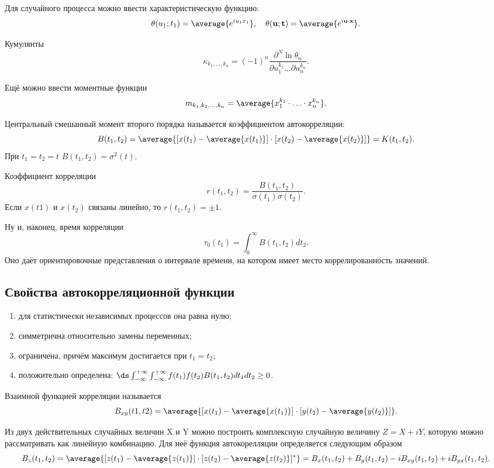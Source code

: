 Для случайного процесса можно ввести характеристическую функцию:
\[
    \theta(u_1;t_1) = \average{e^{iu_1x_1}},\quad
    \theta(\mathbf{u};\mathbf{t}) = \average{e^{i\mathbf{u}\cdot\mathbf{x}}}.
\]

Кумулянты
\[
    \kappa_{k_1,\ldots,k_n} = (-1)^n\frac{\partial^N\ln\theta_n}
    {\partial u_1^{k_1} \ldots \partial u_n^{k_n}}.
\]

Ещё можно ввести моментные функции
\[
    m_{k_1,k_2,\ldots,k_n} = \average{x_1^{k_1}\cdot\ldots\cdot x_n^{k_n}}.
\]

Центральный смешанный момент второго порядка называется коэффициентом
автокорреляции:
\[
    B(t_1, t_2) = \average{[x(t_1) - \average{x(t_1)}]\cdot
    [x(t_2) - \average{x(t_2)}]} = K(t_1,t_2).
\]
При \( t_1 = t_2 = t \) \( B(t_1, t_2) = \sigma^2(t) \).

Коэффициент корреляции
\[
    r(t_1, t_2) = \frac{B(t_1,t_2)}{\sigma(t_1)\sigma(t_2)}.
\]
Если \( x(t1) \) и \( x(t_2) \) связаны линейно, то \( r(t_1, t_2) = \pm 1 \).

Ну и, наконец, время корреляции
\[
    \tau_0(t_1) = \int_0^\infty B(t_1,t_2) dt_2.
\]
Оно даёт ориентировочные представления о интервале времени, на котором имеет
место коррелированность значений.

\subsection{Свойства автокорреляционной функции}
\begin{enumerate}
    \item для статистически независимых процессов она равна нулю;
    \item симметрична относительно замены переменных;
    \item ограничена, причём максимум достигается при \( t_1 = t_2 \);
    \item положительно определена:
        \( \ds
        \int_{-\infty}^{+\infty}\int_{-\infty}^{+\infty}f(t_1)f(t_2)B(t_1,t_2)
        dt_1 dt_2 \ge 0 \).
\end{enumerate}

Взаимной функцией корреляции называется
\[
    B_{xy}(t1,t2) = \average{[x(t_1) - \average{x(t_1)}]\cdot
    [y(t_2) - \average{y(t_2)}]}.
\]

Из двух действительных случайных величин X и Y можно построить комплексную
случайную величину \( Z = X + iY \), которую можно рассматривать как линейную
комбинацию. Для неё функция автокорелляции определяется следующим образом
\[
    B_z(t_1, t_2) = \average{[z(t_1) - \average{z(t_1)}]\cdot
    [z(t_2) - \average{z(t_2)}]^*} =
    B_x(t_1, t_2) + B_y(t_1,t_2) - iB_{xy}(t_1, t_2) + iB_{yx}(t_1,t_2).
\]

